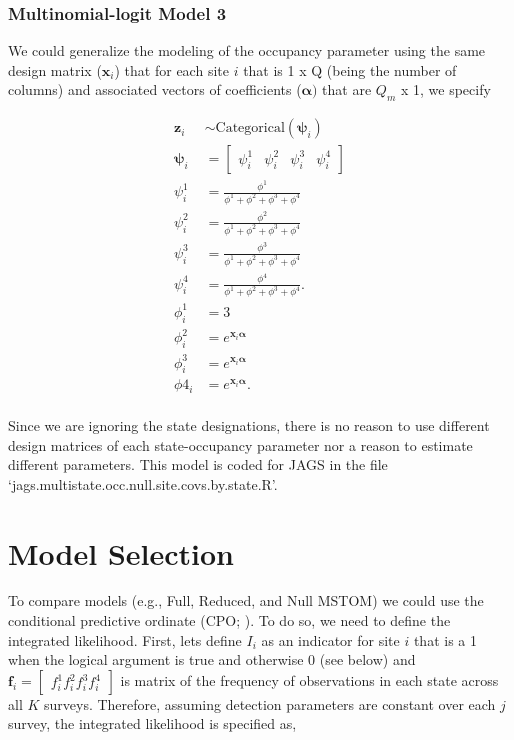 \documentclass[12pt]{article}
\begin{document}
\subsubsection{Multinomial-logit Model 3}
We could generalize the modeling of the occupancy parameter using the same design matrix ($\textbf{x}_{i}$) that for each site $i$ that is 1 x Q (being the number of columns) and associated vectors of coefficients ($\boldsymbol{\alpha})$ that are $Q_{m}$ x 1, we specify
\begin{center}
\begin{align*}
\textbf{z}_{i} &\sim \text{Categorical}(\boldsymbol{\psi}_{i})\\
\boldsymbol{\psi}_{i} &= \begin{bmatrix} \psi^1_{i} & \psi^2_{i} & \psi^3_{i} & \psi^4_{i} \end{bmatrix}\\
\psi^1_{i} &=\frac{\phi^1}{\phi^1+ \phi^2+\phi^3+\phi^4}\\
\psi^2_{i} &=\frac{\phi^2}{\phi^1+ \phi^2+\phi^3+\phi^4}\\
\psi^3_{i} &=\frac{\phi^3}{\phi^1+ \phi^2+\phi^3+\phi^4}\\
\psi^4_{i} &=\frac{\phi^4}{\phi^1+ \phi^2+\phi^3+\phi^4}.\\
\phi^1_{i} &= 3\\
\phi^2_{i} &= e^{\textbf{x}_{i}\boldsymbol{\alpha}}\\
\phi^3_{i} &= e^{\textbf{x}_{i}\boldsymbol{\alpha}}\\
\phi4_{i} &= e^{\textbf{x}_{i}\boldsymbol{\alpha}}.\\
\end{align*}
\end{center}

Since we are ignoring the state designations, there is no reason to use different design matrices of each state-occupancy parameter nor a reason to estimate different parameters. This model is coded for JAGS in the file `jags.multistate.occ.null.site.covs.by.state.R'.



\section{Model Selection}
To compare models (e.g., Full, Reduced, and Null MSTOM) we could use the conditional predictive ordinate (CPO; \citealt{hooten2015}). To do so, we need to define the integrated likelihood. First, lets define $I_{i}$ as an indicator for site $i$ that is a 1 when the logical argument is true and otherwise 0 (see below) and $\boldsymbol{f}_{i} =  \begin{bmatrix}f_{i}^1 f_{i}^2 f_{i}^3 f_{i}^4  \end{bmatrix}$ is matrix of the frequency of observations in each state across all $K$ surveys. Therefore,  assuming detection parameters are constant over each $j$ survey, the integrated likelihood is specified as,
\end{document}
